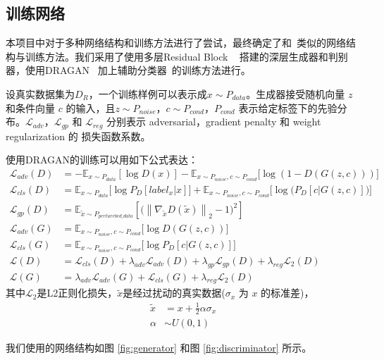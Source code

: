 \documentclass[a4paper,12pt,UTF8]{ctexart}
\newcommand{\norm}[1]{\left\lVert#1\right\rVert}
\begin{document}
\subsection{训练网络}

本项目中对于多种网络结构和训练方法进行了尝试，最终确定了和~\cite{Jin2017Towards}类似的网络结构与训练方法。我们采用了使用多层Residual Block ~\cite{he2016deep} 搭建的深层生成器和判别器，使用DRAGAN ~\cite{kodali2017convergence}加上辅助分类器~\cite{odena2016conditional}的训练方法进行。

设真实数据集为$D_R$，一个训练样例可以表示成$x \sim P_{data}$。生成器接受随机向量 $z$ 和条件向量 $c$ 的输入，且$z \sim P_{noise}$，$c \sim P_{cond}$，$P_{cond}$ 表示给定标签下的先验分布。$\mathcal{L}_{adv}$，$\mathcal{L}_{gp}$ 和 $\mathcal{L}_{reg}$ 分别表示 adversarial，gradient penalty 和 weight regularization 的 损失函数系数。

使用DRAGAN的训练可以用如下公式表达：
%
\begin{align}
  \mathcal{L}_{adv}(D) &= -\mathbb{E}_{x\sim P_{data}}[\log D(x)] - \mathbb{E}_{x\sim P_{noise},c\sim P_{cond}}\big[\log(1-D(G(z,c)))\big] \\
  \mathcal{L}_{cls}(D) &= \mathbb{E}_{x\sim P_{data}}\big[\log P_D[label_x|x]\big] + \mathbb{E}_{x\sim P_{noise},c\sim P_{cond}}\Big[\log\big(P_D[c|G(z,c)]\big)\Big] \\
  \mathcal{L}_{gp}(D) &= \mathbb{E}_{\tilde{x}\sim P_{perturebed\_data}}\left[\big(\norm{\nabla_{\tilde{x}}D(\tilde{x})}_2-1\big)^2\right] \\
  \mathcal{L}_{adv}(G) &= \mathbb{E}_{x\sim P_{noise},c\sim P_{cond}}\big[\log D(G(z,c))\big] \\
  \mathcal{L}_{cls}(G) &= \mathbb{E}_{x\sim P_{noise},c\sim P_{cond}}\big[\log P_D[c|G(z,c)]\big] \\
  \mathcal{L}(D) &= \mathcal{L}_{cls}(D) + \lambda_{adv}\mathcal{L}_{adv}(D) + \lambda_{gp}\mathcal{L}_{gp}(D) + \lambda_{reg} \mathcal{L}_{2}(D) \\
  \mathcal{L}(G) &= \lambda_{adv}\mathcal{L}_{adv}(G) + \mathcal{L}_{cls}(G) + \lambda_{reg} \mathcal{L}_{2}(D)
\end{align}
%
其中$\mathcal{L}_{2}$是L2正则化损失，$\tilde{x}$是经过扰动的真实数据($\sigma_x$ 为 $x$ 的标准差)，
%
\begin{align}
  \tilde{x} & = x + \frac{1}{2}\alpha\sigma_x \\
  \alpha & \sim U(0, 1)
\end{align}

我们使用的网络结构如图 \ref{fig:generator} 和图 \ref{fig:discriminator} 所示。
\end{document}
